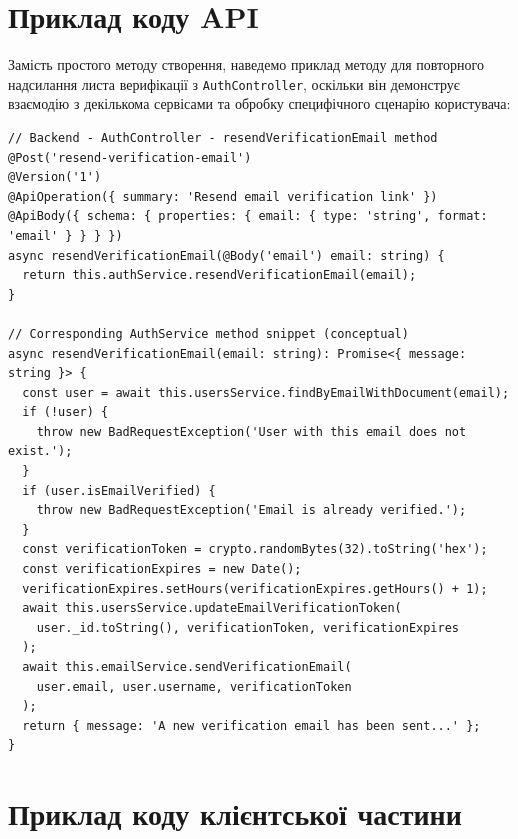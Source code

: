 \appendix %
\chapter{Приклад коду API}
\label{app:api_code_sample}

Замість простого методу створення, наведемо приклад методу для повторного надсилання листа верифікації з \texttt{AuthController}, оскільки він демонструє взаємодію з декількома сервісами та обробку специфічного сценарію користувача:
\begin{verbatim}
// Backend - AuthController - resendVerificationEmail method
@Post('resend-verification-email')
@Version('1')
@ApiOperation({ summary: 'Resend email verification link' })
@ApiBody({ schema: { properties: { email: { type: 'string', format: 'email' } } } })
async resendVerificationEmail(@Body('email') email: string) {
  return this.authService.resendVerificationEmail(email);
}

// Corresponding AuthService method snippet (conceptual)
async resendVerificationEmail(email: string): Promise<{ message: string }> {
  const user = await this.usersService.findByEmailWithDocument(email);
  if (!user) {
    throw new BadRequestException('User with this email does not exist.');
  }
  if (user.isEmailVerified) {
    throw new BadRequestException('Email is already verified.');
  }
  const verificationToken = crypto.randomBytes(32).toString('hex');
  const verificationExpires = new Date();
  verificationExpires.setHours(verificationExpires.getHours() + 1);
  await this.usersService.updateEmailVerificationToken(
    user._id.toString(), verificationToken, verificationExpires
  );
  await this.emailService.sendVerificationEmail(
    user.email, user.username, verificationToken
  );
  return { message: 'A new verification email has been sent...' };
}
\end{verbatim}

\chapter{Приклад коду клієнтської частини}
\label{app:frontend_code_sample}

